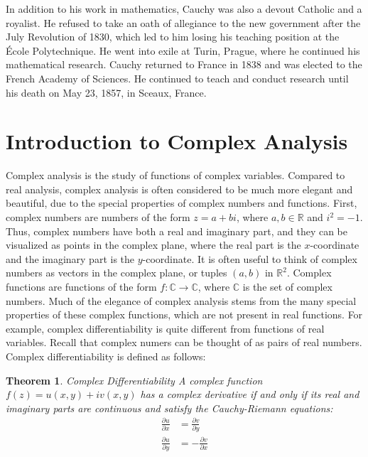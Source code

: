 \documentclass[12pt,letterpaper]{article}
\newtheorem{theorem}{Theorem}
\begin{document}
In addition to his work in mathematics, Cauchy was also a devout Catholic and a royalist. 
He refused to take an oath of allegiance to the new government after the July Revolution of 1830, which led to him losing his teaching position at the École Polytechnique. 
He went into exile at Turin, Prague, where he continued his mathematical research.
Cauchy returned to France in 1838 and was elected to the French Academy of Sciences. 
He continued to teach and conduct research until his death on May 23, 1857, in Sceaux, France.

\section{Introduction to Complex Analysis}
Complex analysis is the study of functions of complex variables.
Compared to real analysis, complex analysis is often considered to be much more elegant and beautiful, due to the special properties of complex numbers and functions.
First, complex numbers are numbers of the form $z = a + bi$, where $a, b \in \mathbb{R}$ and $i^2 = -1$.
Thus, complex numbers have both a real and imaginary part, and they can be visualized as points in the complex plane, where the real part is the $x$-coordinate and the imaginary part is the $y$-coordinate.
It is often useful to think of complex numbers as vectors in the complex plane, or tuples $(a, b)$ in $\mathbb{R}^2$.
Complex functions are functions of the form $f: \mathbb{C} \to \mathbb{C}$, where $\mathbb{C}$ is the set of complex numbers.
Much of the elegance of complex analysis stems from the many special properties of these complex functions, which are not present in real functions.
For example, complex differentiability is quite different from functions of real variables.
Recall that complex numers can be thought of as pairs of real numbers.
Complex differentiability is defined as follows:

\begin{theorem}{Complex Differentiability}
    A complex function $f(z) = u(x, y) + iv(x, y)$ has a complex derivative if and only if its real and imaginary parts are continuous and satisfy the Cauchy-Riemann equations:
    \begin{align*}
        \frac{\partial u}{\partial x} &= \frac{\partial v}{\partial y} \\
        \frac{\partial u}{\partial y} &= -\frac{\partial v}{\partial x}
    \end{align*}
\end{theorem}
\end{document}
